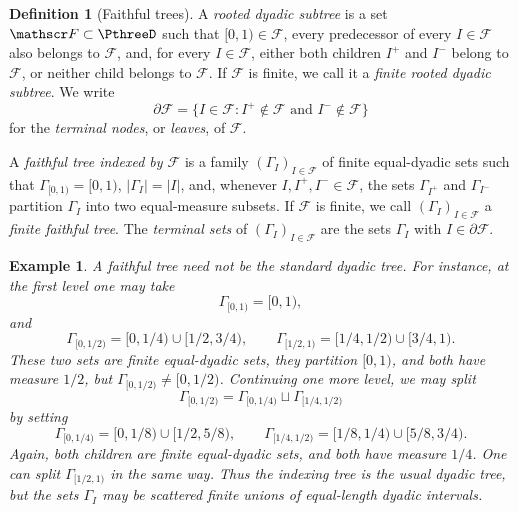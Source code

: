\documentclass[11pt,reqno]{amsart}
\makeatletter
\theoremstyle{plain}
\newtheorem{example}[theorem]{Example}
\theoremstyle{definition}
\newtheorem{definition}[definition]{Definition}
\newcounter{problempaper}
\newenvironment{problempaperbody}{%
  \setcounter{subsection}{0}%
  \setcounter{subsubsection}{0}%
  \setcounter{paragraph}{0}%
  \renewcommand{\thesubsection}{\arabic{subsection}}%
  \renewcommand{\thesubsubsection}{\thesubsection.\arabic{subsubsection}}%
  \renewcommand{\theparagraph}{\thesubsubsection.\arabic{paragraph}}%
  \let\problem@outersection\section
  \let\problem@outersubsection\subsection
  \let\problem@outersubsubsection\subsubsection
  \let\problem@outerparagraph\paragraph
  \let\section\problem@papersection
  \let\subsection\problem@papersubsection
  \let\subsubsection\problem@papersubsubsection
}{%
  \let\section\problem@outersection
  \let\subsection\problem@outersubsection
  \let\subsubsection\problem@outersubsubsection
  \let\paragraph\problem@outerparagraph
}
\newcommand{\problem@target}[2]{%
  \hypertarget{problem-\theproblempaper-#1-#2}{}%
}
\newcommand{\problem@paperheading}[3]{%
  \par\bigskip
  \problem@target{#1}{#2}%
  \noindent{\large\bfseries #2.\quad #3\par}%
  \nobreak\smallskip
}
\newcommand{\problem@papersubheading}[3]{%
  \par\medskip
  \problem@target{#1}{#2}%
  \noindent{\normalsize\bfseries #2.\quad #3\par}%
  \nobreak\smallskip
}
\newcommand{\problem@papersubsubheading}[3]{%
  \par\smallskip
  \problem@target{#1}{#2}%
  \noindent{\normalsize\itshape #2.\quad #3.\ }%
}
\def\problem@papersection{%
  \@ifstar{\problem@papersectionstar}{\problem@papersectionnostar}%
}
\def\problem@papersectionstar#1{%
  \par\bigskip\noindent{\large\bfseries #1\par}\nobreak\smallskip
}
\def\problem@papersectionnostar#1{%
  \refstepcounter{subsection}%
  \setcounter{subsubsection}{0}%
  \setcounter{paragraph}{0}%
  \problem@paperheading{section}{\thesubsection}{#1}%
  \problem@writecontentsline{section}{\thesubsection}{#1}%
}
\def\problem@papersubsection{%
  \@ifstar{\problem@papersubsectionstar}{\problem@papersubsectionnostar}%
}
\def\problem@papersubsectionstar#1{%
  \par\medskip\noindent{\normalsize\bfseries #1\par}\nobreak\smallskip
}
\def\problem@papersubsectionnostar#1{%
  \refstepcounter{subsubsection}%
  \setcounter{paragraph}{0}%
  \problem@papersubheading{subsection}{\thesubsubsection}{#1}%
  \problem@writecontentsline{subsection}{\thesubsubsection}{#1}%
}
\def\problem@papersubsubsection{%
  \@ifstar{\problem@papersubsubsectionstar}{\problem@papersubsubsectionnostar}%
}
\def\problem@papersubsubsectionstar#1{%
  \par\smallskip\noindent{\normalsize\itshape #1.\ }%
}
\def\problem@papersubsubsectionnostar#1{%
  \refstepcounter{paragraph}%
  \problem@papersubsubheading{subsubsection}{\theparagraph}{#1}%
  \problem@writecontentsline{subsubsection}{\theparagraph}{#1}%
}
\newcommand{\problem@writecontentsline}[3]{%
  \begingroup
  \protected@write\@auxout{}{%
    \string\problemcontentsentry{\theproblempaper}{#1}{#2}{#3}{\thepage}%
  }%
  \endgroup
}
\newcommand{\problemcontentsentry}[5]{%
  \@ifundefined{problemcontents@#1}{%
    \expandafter\gdef\csname problemcontents@#1\endcsname{}%
  }{}%
  \expandafter\g@addto@macro\csname problemcontents@#1\endcsname{%
    \problemcontentsline{#1}{#2}{#3}{#4}{#5}%
  }%
}
\newcommand{\problemcontentslink}[4]{%
  \hyperlink{problem-#1-#2-#3}{#4}%
}
\newcommand{\problemcontentsline}[5]{%
  \ifstrequal{#2}{section}{%
    \par\noindent
    \problemcontentslink{#1}{#2}{#3}{\makebox[2.5em][l]{#3}#4}%
    \nobreak\dotfill
    \problemcontentslink{#1}{#2}{#3}{#5}\par
  }{%
    \ifstrequal{#2}{subsection}{%
      \par\noindent\hspace*{1.5em}%
      \problemcontentslink{#1}{#2}{#3}{\makebox[3.5em][l]{#3}#4}%
      \nobreak\dotfill
      \problemcontentslink{#1}{#2}{#3}{#5}\par
    }{%
      \par\noindent\hspace*{3em}%
      \problemcontentslink{#1}{#2}{#3}{\makebox[4.5em][l]{#3}#4}%
      \nobreak\dotfill
      \problemcontentslink{#1}{#2}{#3}{#5}\par
    }%
  }%
}
\makeatother
\begin{document}
\begin{problempaperbody}
\begin{definition}[Faithful trees]
\label{p3:def:-faithful-tree}
A \emph{rooted dyadic subtree} is a set $\mathscr F\subset\PthreeD$ such that $[0,1)\in\mathscr F$, every predecessor of every $I\in\mathscr F$ also belongs to $\mathscr F$, and, for every $I\in\mathscr F$, either both children $I^+$ and $I^-$ belong to $\mathscr F$, or neither child belongs to $\mathscr F$. If $\mathscr F$ is finite, we call it a \emph{finite rooted dyadic subtree}. We write
\begin{equation*}
        \partial\mathscr F=\{I\in\mathscr F\colon I^+\notin\mathscr F \text{ and } I^-\notin\mathscr F\}
\end{equation*}
for the \emph{terminal nodes}, or \emph{leaves}, of $\mathscr F$.

A \emph{ faithful tree indexed by $\mathscr F$} is a family $(\Gamma_I)_{I\in\mathscr F}$ of finite equal-dyadic sets such that $\Gamma_{[0,1)}=[0,1)$, $|\Gamma_I|=|I|$, and, whenever $I,I^+,I^-\in\mathscr F$, the sets $\Gamma_{I^+}$ and $\Gamma_{I^-}$ partition $\Gamma_I$ into two equal-measure subsets. If $\mathscr F$ is finite, we call $(\Gamma_I)_{I\in\mathscr F}$ a \emph{finite  faithful tree}. The \emph{terminal sets} of $(\Gamma_I)_{I\in\mathscr F}$ are the sets $\Gamma_I$ with $I\in\partial\mathscr F$.
\end{definition}

\begin{example}
A faithful tree need not be the standard dyadic tree. For instance, at the first level one may take
\begin{equation*}
        \Gamma_{[0,1)}=[0,1),
\end{equation*}
and
\begin{equation*}
        \Gamma_{[0,1/2)}=[0,1/4)\cup[1/2,3/4),\qquad
        \Gamma_{[1/2,1)}=[1/4,1/2)\cup[3/4,1).
\end{equation*}
These two sets are finite equal-dyadic sets, they partition $[0,1)$, and both have measure $1/2$, but $\Gamma_{[0,1/2)}\neq[0,1/2)$. Continuing one more level, we may split
\begin{equation*}
        \Gamma_{[0,1/2)}=\Gamma_{[0,1/4)}\sqcup\Gamma_{[1/4,1/2)}
\end{equation*}
by setting
\begin{equation*}
        \Gamma_{[0,1/4)}=[0,1/8)\cup[1/2,5/8),\qquad
        \Gamma_{[1/4,1/2)}=[1/8,1/4)\cup[5/8,3/4).
\end{equation*}
Again, both children are finite equal-dyadic sets, and both have measure $1/4$. One can split $\Gamma_{[1/2,1)}$ in the same way. Thus the indexing tree is the usual dyadic tree, but the sets $\Gamma_I$ may be scattered finite unions of equal-length dyadic intervals.
\end{example}


\end{problempaperbody}
\end{document}
